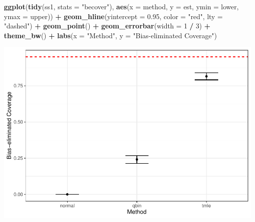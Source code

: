 \documentclass[
]{article}
\newenvironment{Shaded}{\begin{snugshade}}{\end{snugshade}}
\newcommand{\AttributeTok}[1]{\textcolor[rgb]{0.13,0.29,0.53}{#1}}
\newcommand{\DecValTok}[1]{\textcolor[rgb]{0.00,0.00,0.81}{#1}}
\newcommand{\FloatTok}[1]{\textcolor[rgb]{0.00,0.00,0.81}{#1}}
\newcommand{\FunctionTok}[1]{\textcolor[rgb]{0.13,0.29,0.53}{\textbf{#1}}}
\newcommand{\NormalTok}[1]{#1}
\newcommand{\SpecialCharTok}[1]{\textcolor[rgb]{0.81,0.36,0.00}{\textbf{#1}}}
\newcommand{\StringTok}[1]{\textcolor[rgb]{0.31,0.60,0.02}{#1}}
\begin{document}
\begin{Shaded}
\begin{Highlighting}[]
\FunctionTok{ggplot}\NormalTok{(}\FunctionTok{tidy}\NormalTok{(ss1, }\AttributeTok{stats =} \StringTok{"becover"}\NormalTok{), }\FunctionTok{aes}\NormalTok{(}\AttributeTok{x =}\NormalTok{ method, }\AttributeTok{y =}\NormalTok{ est, }\AttributeTok{ymin =}\NormalTok{ lower, }\AttributeTok{ymax =}\NormalTok{ upper)) }\SpecialCharTok{+}
  \FunctionTok{geom\_hline}\NormalTok{(}\AttributeTok{yintercept =} \FloatTok{0.95}\NormalTok{, }\AttributeTok{color =} \StringTok{"red"}\NormalTok{, }\AttributeTok{lty =} \StringTok{"dashed"}\NormalTok{) }\SpecialCharTok{+}
  \FunctionTok{geom\_point}\NormalTok{() }\SpecialCharTok{+}
  \FunctionTok{geom\_errorbar}\NormalTok{(}\AttributeTok{width =} \DecValTok{1} \SpecialCharTok{/} \DecValTok{3}\NormalTok{) }\SpecialCharTok{+}
  \FunctionTok{theme\_bw}\NormalTok{() }\SpecialCharTok{+}
  \FunctionTok{labs}\NormalTok{(}\AttributeTok{x =} \StringTok{"Method"}\NormalTok{, }\AttributeTok{y =} \StringTok{"Bias{-}eliminated Coverage"}\NormalTok{)}
\end{Highlighting}
\end{Shaded}

\includegraphics{simulation_files/figure-latex/sim-results-3.pdf}
\end{document}
